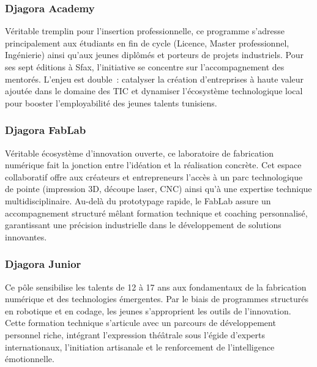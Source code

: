 \subsubsection{Djagora Academy}
\label{sec:djagora-academy}

Véritable tremplin pour l'insertion professionnelle, ce programme s'adresse principalement aux étudiants en fin de cycle (Licence, Master professionnel, Ingénierie) ainsi qu'aux jeunes diplômés et porteurs de projets industriels. Pour ses sept éditions à Sfax, l'initiative se concentre sur l'accompagnement des mentorés. L'enjeu est double~: catalyser la création d'entreprises à haute valeur ajoutée dans le domaine des TIC et dynamiser l'écosystème technologique local pour booster l'employabilité des jeunes talents tunisiens.


\subsubsection{Djagora FabLab}

Véritable écosystème d'innovation ouverte, ce laboratoire de fabrication numérique fait la jonction entre l'idéation et la réalisation concrète. Cet espace collaboratif offre aux créateurs et entrepreneurs l'accès à un parc technologique de pointe (impression 3D, découpe laser, CNC) ainsi qu'à une expertise technique multidisciplinaire. Au-delà du prototypage rapide, le FabLab assure un accompagnement structuré mêlant formation technique et coaching personnalisé, garantissant une précision industrielle dans le développement de solutions innovantes.


\subsubsection{Djagora Junior}

Ce pôle sensibilise les talents de 12 à 17 ans aux fondamentaux de la fabrication numérique et des technologies émergentes. Par le biais de programmes structurés en robotique et en codage, les jeunes s'approprient les outils de l'innovation. Cette formation technique s'articule avec un parcours de développement personnel riche, intégrant l'expression théâtrale sous l'égide d'experts internationaux, l'initiation artisanale et le renforcement de l'intelligence émotionnelle.



